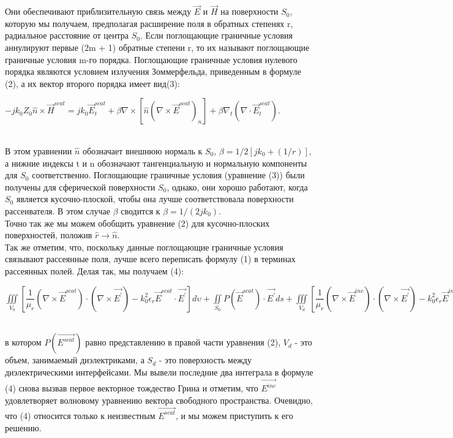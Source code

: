 Они обеспечивают приблизительную связь между $\vec{E}$ и $\vec{H}$ на поверхности $ S_{0} $, которую мы получаем, предполагая расширение поля в обратных степенях r, радиальное расстояние от центра $S_{0}$. Если поглощающие граничные условия аннулируют первые (2m + 1) обратные степени r, то их называют поглощающие граничные условия m-го порядка.
Поглощающие граничные условия нулевого порядка являются условием излучения Зоммерфельда, приведенным в формуле (2), а их вектор второго порядка имеет вид(3):\\
\begin{center}
	$ -jk_{0}Z_{0}\hat{n} \times \vec{H}^{scat} = jk_{0}\vec{E}_{t}^{scat} + \beta \nabla \times [\hat{n}(\nabla \times \vec{E}^{scat})_{n}] + \beta\nabla_{t} (\nabla \cdot \vec{E}_{t}^{scat})$.
\end{center} \\
В этом уравнении $ \hat{n} $ обозначает внешнюю нормаль к $S_{0}$, $\beta = 1/{2[jk_{0} + (1/r)]}$, а нижние индексы t и n обозначают тангенциальную и нормальную компоненты для $ S_{0} $ соответственно. 
Поглощающие граничные условия (уравнение (3)) были получены для сферической поверхности $ S_{0} $, однако, они хорошо работают, когда $ S_{0} $ является кусочно-плоской, чтобы она лучше соответствовала поверхности рассеивателя.
В этом случае $ \beta $ сводится к $ \beta = 1/(2jk_{0}) $.\\
Точно так же мы можем обобщить уравнение (2) для кусочно-плоских поверхностей, положив $ \hat{r} \rightarrow \hat{n} $.\\
Так же отметим, что, поскольку данные поглощающие граничные условия связывают рассеянные поля, лучше всего переписать формулу (1) в терминах рассеянных полей. Делая так, мы получаем (4): \\
\begin{center}
	$ \iiint\limits_{V_{0}}^{} \left[ \dfrac{1}{\mu_{r}}(\nabla \times \vec{E}^{scat}) \cdot (\nabla \times \vec{E^{'}}) - k_{0}^{2} \epsilon_{r}\vec{E}^{scat} \cdot \vec{E^{'}} \right]d\upsilon + 
	\iint\limits_{S_{0}}^{}  P(\vec{E}^{scat}) \cdot \vec{E^{'}}ds + 
	\iiint\limits_{V_{d}}^{} \left[ \dfrac{1}{\mu_{r}}(\nabla \times \vec{E}^{inc}) \cdot (\nabla \times \vec{E^{'}}) - k_{0}^{2} \epsilon_{r}\vec{E}^{inc} \cdot \vec{E^{'}} \right]d\upsilon + 
	jk_{0}Z_{0}\iint\limits_{S_{d}}^{} \dfrac{1}{\mu_{r}}(\hat{n} \times \vec{H}^{inc}) \cdot \vec{E^{'}}ds = 0, $
\end{center}\\
в котором $P(\vec{E^{scat}})$ равно представлению в правой части уравнения (2), $ V_{d} $ - это объем, занимаемый диэлектриками, а $ S_{d} $ - это поверхность между диэлектрическими интерфейсами. Мы вывели последние два интеграла в формуле (4) снова вызвав первое векторное тождество Грина и отметим, что $ \vec{E^{inc}} $ удовлетворяет волновому уравнению вектора свободного пространства. Очевидно, что (4) относится только к неизвестным $ \vec{E^{scat}} $, и мы можем приступить к его решению.
